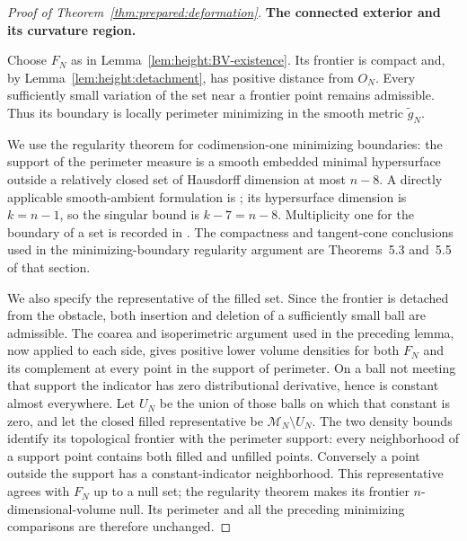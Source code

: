 \begin{proof}[Proof of Theorem~\ref{thm:prepared:deformation}]
\smallskip\noindent\textbf{The connected exterior and its curvature region.}

Choose $F_N$ as in Lemma~\ref{lem:height:BV-existence}.  Its frontier
is compact and, by Lemma~\ref{lem:height:detachment}, has positive
distance from $O_N$.  Every sufficiently small variation of the set
near a frontier point remains admissible.  Thus its boundary is locally
perimeter minimizing in the smooth metric $\widetilde g_N$.

We use the regularity theorem for codimension-one minimizing boundaries:
the support of the perimeter measure is a smooth embedded minimal
hypersurface outside a relatively closed set of Hausdorff dimension at
most $n-8$. A directly applicable smooth-ambient formulation is
\cite[Chapter~7, Section~5, Theorem~5.8]{SimonGMT}; its hypersurface
dimension is $k=n-1$, so the singular bound is $k-7=n-8$.
Multiplicity one for the boundary of a set is recorded in
\cite[Chapter~7, Section~5, Remark~5.2]{SimonGMT}. The compactness and
tangent-cone conclusions used in the minimizing-boundary regularity
argument are Theorems~5.3 and~5.5 of that section.

We also specify the representative of the filled set. Since the
frontier is detached from the obstacle, both insertion and deletion
of a sufficiently small ball are admissible. The coarea and
isoperimetric argument used in the preceding lemma, now applied to
each side, gives positive lower volume densities for both $F_N$ and
its complement at every point in the support of perimeter. On a ball
not meeting that support the indicator has zero distributional
derivative, hence is constant almost everywhere. Let $U_N$ be the
union of those balls on which that constant is zero, and let the
closed filled representative be $\mathcal M_N\setminus U_N$.
The two density bounds identify its topological frontier with the
perimeter support: every neighborhood of a support point contains
both filled and unfilled points. Conversely a point outside the
support has a constant-indicator neighborhood. This representative
agrees with $F_N$ up to a null set; the regularity theorem makes its
frontier $n$-dimensional-volume null. Its perimeter and all the
preceding minimizing comparisons are therefore unchanged.


\end{proof}

